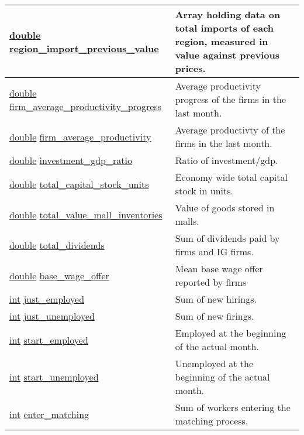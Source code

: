 \documentclass[a4paper,11pt]{article}
\begin{document}
\begin{longtable}[H!]{ll}
\midrule
\parbox{5cm}{\url{double} \url{region_import_previous_value}}  & \parbox{10cm}{Array holding data on total imports of each region, measured in value against previous prices.} \\
\midrule
\parbox{5cm}{\url{double} \url{firm_average_productivity_progress}}  & \parbox{10cm}{Average productivity progress of the firms in the last month.} \\
\midrule
\parbox{5cm}{\url{double} \url{firm_average_productivity}}  & \parbox{10cm}{Average productivty of the firms in the last month.} \\
\midrule
\parbox{5cm}{\url{double} \url{investment_gdp_ratio}}  & \parbox{10cm}{Ratio of investment/gdp.} \\
\midrule
\parbox{5cm}{\url{double} \url{total_capital_stock_units}}  & \parbox{10cm}{Economy wide total capital stock in units.} \\
\midrule
\parbox{5cm}{\url{double} \url{total_value_mall_inventories}}  & \parbox{10cm}{Value of goods stored in malls.} \\
\midrule
\parbox{5cm}{\url{double} \url{total_dividends}}  & \parbox{10cm}{Sum of dividends paid by firms and IG firms.} \\
\midrule
\parbox{5cm}{\url{double} \url{base_wage_offer}}  & \parbox{10cm}{Mean base wage offer reported by firms
} \\
\midrule
\parbox{5cm}{\url{int} \url{just_employed}}  & \parbox{10cm}{Sum of new hirings.} \\
\midrule
\parbox{5cm}{\url{int} \url{just_unemployed}}  & \parbox{10cm}{Sum of new firings.} \\
\midrule
\parbox{5cm}{\url{int} \url{start_employed}}  & \parbox{10cm}{Employed at the beginning of the actual month.} \\
\midrule
\parbox{5cm}{\url{int} \url{start_unemployed}}  & \parbox{10cm}{Unemployed at the beginning of the actual month.} \\
\midrule
\parbox{5cm}{\url{int} \url{enter_matching}}  & \parbox{10cm}{Sum of workers entering the matching process.} \\

\end{longtable}
\end{document}
